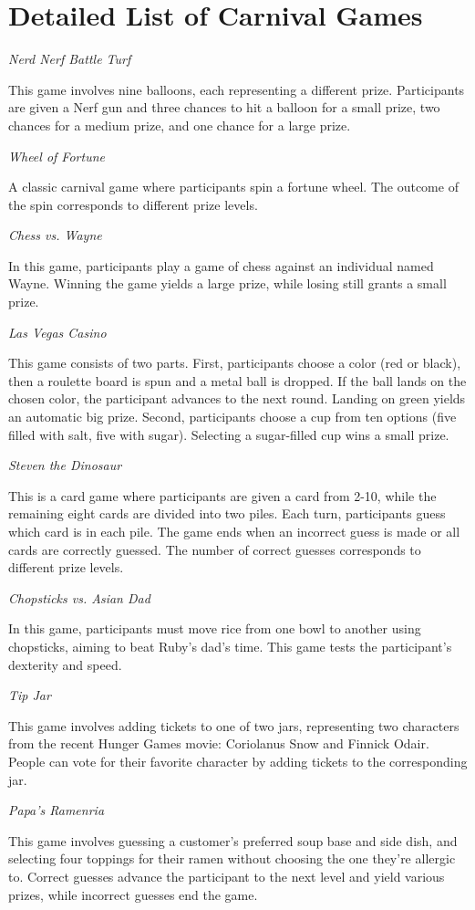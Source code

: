 \section{Detailed List of Carnival Games}
\label{appendix:carnival_games}

\textit{Nerd Nerf Battle Turf}

This game involves nine balloons, each representing a different prize. Participants are given a Nerf gun and three chances to hit a balloon for a small prize, two chances for a medium prize, and one chance for a large prize.

\textit{Wheel of Fortune}

A classic carnival game where participants spin a fortune wheel. The outcome of the spin corresponds to different prize levels.

\textit{Chess vs. Wayne}

In this game, participants play a game of chess against an individual named Wayne. Winning the game yields a large prize, while losing still grants a small prize.

\textit{Las Vegas Casino}

This game consists of two parts. First, participants choose a color (red or black), then a roulette board is spun and a metal ball is dropped. If the ball lands on the chosen color, the participant advances to the next round. Landing on green yields an automatic big prize. Second, participants choose a cup from ten options (five filled with salt, five with sugar). Selecting a sugar-filled cup wins a small prize.

\textit{Steven the Dinosaur}

This is a card game where participants are given a card from 2-10, while the remaining eight cards are divided into two piles. Each turn, participants guess which card is in each pile. The game ends when an incorrect guess is made or all cards are correctly guessed. The number of correct guesses corresponds to different prize levels.

\textit{Chopsticks vs. Asian Dad}

In this game, participants must move rice from one bowl to another using chopsticks, aiming to beat Ruby's dad's time. This game tests the participant's dexterity and speed.

\textit{Tip Jar}

This game involves adding tickets to one of two jars, representing two characters from the recent Hunger Games movie: Coriolanus Snow and Finnick Odair. People can vote for their favorite character by adding tickets to the corresponding jar.

\textit{Papa's Ramenria}

This game involves guessing a customer's preferred soup base and side dish, and selecting four toppings for their ramen without choosing the one they're allergic to. Correct guesses advance the participant to the next level and yield various prizes, while incorrect guesses end the game.
